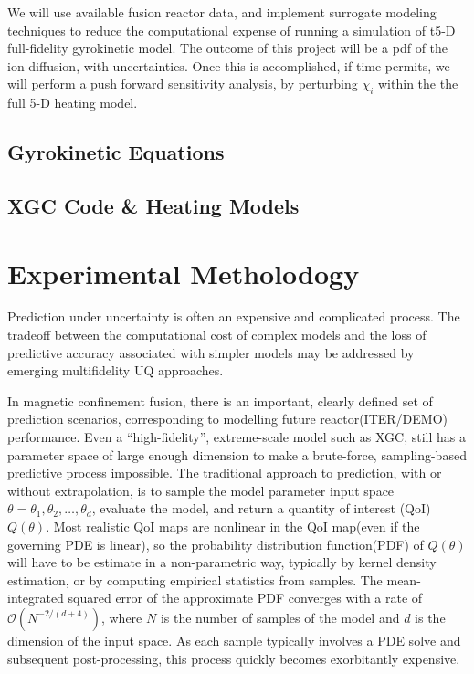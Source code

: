 \documentclass{article}
\begin{document}
We will use available fusion reactor data, and implement surrogate modeling techniques to reduce the computational expense of running a simulation of t5-D full-fidelity gyrokinetic model. The outcome of this project will be a pdf of the ion diffusion, with uncertainties. Once this is accomplished, if time permits, we will perform a push forward sensitivity analysis, by perturbing $\chi_i$ within the the full 5-D heating model.\\ 

\subsection{Gyrokinetic Equations}
\subsection{XGC Code \& Heating Models}
\section{Experimental Metholodogy}
Prediction under uncertainty is often an expensive and complicated process\cite{odensiam1,odensiam2}.
The tradeoff between the computational cost of complex models and the loss of predictive accuracy 
associated with simpler models may be addressed by emerging multifidelity UQ approaches\cite{ngmulti,Pehermulti}.

In magnetic confinement fusion, there is an important, clearly defined set of prediction scenarios, corresponding 
to modelling future reactor(ITER/DEMO) performance.  Even a ``high-fidelity'', extreme-scale model such as XGC, still
has a parameter space of large enough dimension to make a brute-force, 
sampling-based predictive process
impossible.  
The traditional approach to prediction, with or without extrapolation, is to sample the model parameter input space
$\theta=\theta_1,\theta_2, \ldots, \theta_d$, evaluate the model, and return a quantity of interest (QoI) $Q(\theta)$.
Most realistic QoI maps are nonlinear in the QoI map(even if the governing PDE is linear), 
so the probability distribution function(PDF) of $Q(\theta)$ will
have to be estimate in a non-parametric way, typically
 by kernel density estimation, or by computing empirical 
statistics from samples.
The mean-integrated squared error
of the approximate PDF converges with a rate of $\mathcal{O}(N^{-2/(d+4)})$, where $N$ is the number of samples of the model
and $d$ is the dimension of the input space.  As each sample typically involves a PDE solve and subsequent post-processing,
this process quickly becomes exorbitantly expensive.  
\end{document}
